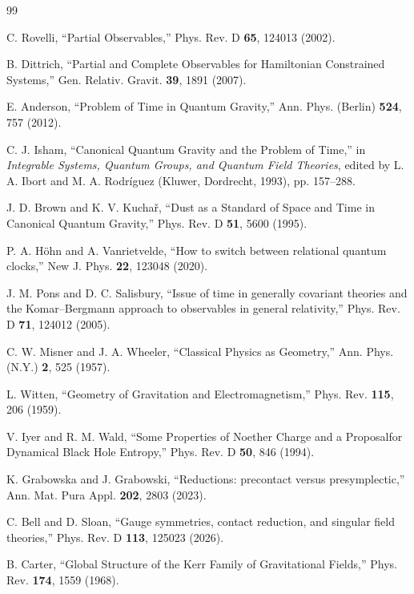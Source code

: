 \documentclass[aps,prl,reprint]{revtex4-2}
\begin{document}
\begin{thebibliography}{99}

C. Rovelli,
``Partial Observables,''
Phys. Rev. D \textbf{65}, 124013 (2002).

B. Dittrich,
``Partial and Complete Observables for Hamiltonian Constrained Systems,''
Gen. Relativ. Gravit. \textbf{39}, 1891 (2007).

E. Anderson,
``Problem of Time in Quantum Gravity,''
Ann. Phys. (Berlin) \textbf{524}, 757 (2012).

C. J. Isham,
``Canonical Quantum Gravity and the Problem of Time,''
in \textit{Integrable Systems, Quantum Groups, and Quantum Field Theories},
edited by L. A. Ibort and M. A. Rodr\'iguez
(Kluwer, Dordrecht, 1993), pp. 157--288.

J. D. Brown and K. V. Kucha\v{r},
``Dust as a Standard of Space and Time in Canonical Quantum Gravity,''
Phys. Rev. D \textbf{51}, 5600 (1995).

P. A. H\"ohn and A. Vanrietvelde,
``How to switch between relational quantum clocks,''
New J. Phys. \textbf{22}, 123048 (2020).

J. M. Pons and D. C. Salisbury,
``Issue of time in generally covariant theories and the Komar--Bergmann approach to observables in general relativity,''
Phys. Rev. D \textbf{71}, 124012 (2005).

C. W. Misner and J. A. Wheeler,
``Classical Physics as Geometry,''
Ann. Phys. (N.Y.) \textbf{2}, 525 (1957).

L. Witten,
``Geometry of Gravitation and Electromagnetism,''
Phys. Rev. \textbf{115}, 206 (1959).

V. Iyer and R. M. Wald,
``Some Properties of Noether Charge and a Proposal\linebreak[1] for Dynamical Black Hole Entropy,''
Phys. Rev. D \textbf{50}, 846 (1994).

K. Grabowska and J. Grabowski,
``Reductions: precontact versus presymplectic,''
Ann. Mat. Pura Appl. \textbf{202}, 2803 (2023).

C. Bell and D. Sloan,
``Gauge symmetries, contact reduction, and singular field theories,''
Phys. Rev. D \textbf{113}, 125023 (2026).

B. Carter,
``Global Structure of the Kerr Family of Gravitational Fields,''
Phys. Rev. \textbf{174}, 1559 (1968).


\end{thebibliography}
\end{document}
